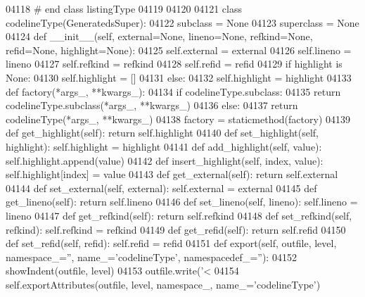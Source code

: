 \begin{DoxyCode}
{{{{{{{{{{{{{{{{{{{{{{{{{{{{{{{{{{{{{{{{{{{{{{{{{{{{{{{{{{{{{{{{{{{{{{{{{{{{{{{{{{{{{{{{{{{{{{{{{{{{{{{{{{{{{{{{{{{{{{{{{{{{{{{{{{{{{{{{{{{{{{{{{{{{{{{{{{{{{{{{{{{{{{{{{{{{{{{{{{{{{{{{{{{{{{{{{{{{{{{{{{{{{{{{{{{{{{{{{{{{{{{{{{{{{{{{{{{{{{{{{{{{{{{{{{{{{{{{{{{{{{{{{{{04118 \textcolor{comment}{# end class listingType}
04119 
04120 
04121 \textcolor{keyword}{class }codelineType(GeneratedsSuper):
04122     subclass = \textcolor{keywordtype}{None}
04123     superclass = \textcolor{keywordtype}{None}
04124     \textcolor{keyword}{def }__init__(self, external=None, lineno=None, refkind=None, refid=None, highlight=None):
04125         self.external = external
04126         self.lineno = lineno
04127         self.refkind = refkind
04128         self.refid = refid
04129         \textcolor{keywordflow}{if} highlight \textcolor{keywordflow}{is} \textcolor{keywordtype}{None}:
04130             self.highlight = []
04131         \textcolor{keywordflow}{else}:
04132             self.highlight = highlight
04133     \textcolor{keyword}{def }factory(*args\_, **kwargs\_):
04134         \textcolor{keywordflow}{if} codelineType.subclass:
04135             \textcolor{keywordflow}{return} codelineType.subclass(*args\_, **kwargs\_)
04136         \textcolor{keywordflow}{else}:
04137             \textcolor{keywordflow}{return} codelineType(*args\_, **kwargs\_)
04138     factory = staticmethod(factory)
04139     \textcolor{keyword}{def }get_highlight(self): \textcolor{keywordflow}{return} self.highlight
04140     \textcolor{keyword}{def }set_highlight(self, highlight): self.highlight = highlight
04141     \textcolor{keyword}{def }add_highlight(self, value): self.highlight.append(value)
04142     \textcolor{keyword}{def }insert_highlight(self, index, value): self.highlight[index] = value
04143     \textcolor{keyword}{def }get_external(self): \textcolor{keywordflow}{return} self.external
04144     \textcolor{keyword}{def }set_external(self, external): self.external = external
04145     \textcolor{keyword}{def }get_lineno(self): \textcolor{keywordflow}{return} self.lineno
04146     \textcolor{keyword}{def }set_lineno(self, lineno): self.lineno = lineno
04147     \textcolor{keyword}{def }get_refkind(self): \textcolor{keywordflow}{return} self.refkind
04148     \textcolor{keyword}{def }set_refkind(self, refkind): self.refkind = refkind
04149     \textcolor{keyword}{def }get_refid(self): \textcolor{keywordflow}{return} self.refid
04150     \textcolor{keyword}{def }set_refid(self, refid): self.refid = refid
04151     \textcolor{keyword}{def }export(self, outfile, level, namespace\_='', name\_='codelineType', namespacedef\_=''):
04152         showIndent(outfile, level)
04153         outfile.write(\textcolor{stringliteral}{'<%
04154         self.exportAttributes(outfile, level, namespace\_, name\_=\textcolor{stringliteral}{'codelineType'})
}}}}}}}}}}}}}}}}}}}}}}}}}}}}}}}}}}}}}}}}}}}}}}}}}}}}}}}}}}}}}}}}}}}}}}}}}}}}}}}}}}}}}}}}}}}}}}}}}}}}}}}}}}}}}}}}}}}}}}}}}}}}}}}}}}}}}}}}}}}}}}}}}}}}}}}}}}}}}}}}}}}}}}}}}}}}}}}}}}}}}}}}}}}}}}}}}}}}}}}}}}}}}}}}}}}}}}}}}}}}}}}}}}}}}}}}}}}}}}}}}}}}}}}}}}}}}}}}}}}}}}}}}}}}
\end{DoxyCode}
